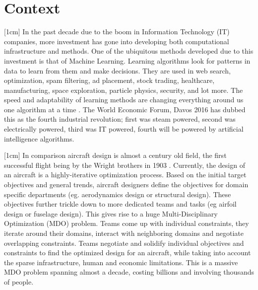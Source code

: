 \chapter{Context}
\label{chapIntroduction}

[1cm]
In the past decade due to the boom in Information Technology (IT) companies, more investment has gone into developing both computational infrastructure and methods. One of the ubiquitous methods developed due to this investment is that of Machine Learning. Learning algorithms look for patterns in data to learn from them and make decisions. They are used in web search, optimization, spam filtering, ad placement, stock trading, healthcare, manufacturing, space exploration, particle physics, security, and lot more. The speed and adaptability of learning methods are changing everything around us one algorithm at a time \cite{domingos2015master}. The World Economic Forum, Davos 2016 \cite{schwab2016fourth} has dubbed this as the fourth industrial revolution; first was steam powered, second was electrically powered, third was IT powered, fourth will be powered by artificial intelligence algorithms.

[1cm]
In comparison aircraft design is almost a century old field, the first successful flight being by the Wright brothers in 1903 \cite{wright1934we}. Currently, the design of an aircraft is a highly-iterative optimization process. Based on the initial target objectives and general trends, aircraft designers define the objectives for domain specific departments (eg. aerodynamics design or structural design). These objectives further trickle down to more dedicated teams and tasks (eg airfoil design or fuselage design). This gives rise to a huge Multi-Disciplinary Optimization (MDO) problem. Teams come up with individual constraints, they iterate around their domains, interact with neighboring domains and negotiate overlapping constraints. Teams negotiate and solidify individual objectives and constraints to find the optimized design for an aircraft, while taking into account the sparse infrastructure, human and economic limitations. This is a massive MDO problem spanning almost a decade, costing billions and involving thousands of people. 

